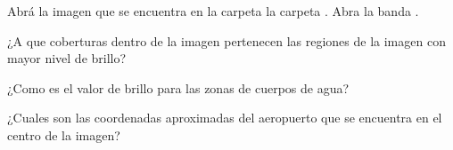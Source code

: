 Abrá la imagen que se encuentra en la carpeta la  carpeta . Abra la banda .

\begin{que}
    ¿A que coberturas dentro de la imagen pertenecen las regiones de la imagen con mayor nivel de brillo?
\end{que}

\begin{que}
    ¿Como es el valor de brillo para las zonas de cuerpos de agua?
\end{que}

\begin{que}
    ¿Cuales son las coordenadas aproximadas del aeropuerto que se encuentra en el centro de la imagen?
\end{que}
